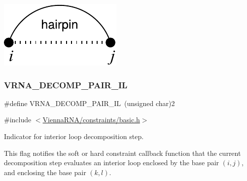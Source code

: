  
\begin{DoxyImageNoCaption}
  \mbox{\includegraphics[width=\textwidth,height=\textheight/2,keepaspectratio=true]{decomp_hp}}
\end{DoxyImageNoCaption}
 \mbox{\label{group__constraints_gaeab04f34d7730cff2d651d782f95d857}} 
\subsubsection{\texorpdfstring{VRNA\_DECOMP\_PAIR\_IL}{VRNA\_DECOMP\_PAIR\_IL}}
{\footnotesize\ttfamily \#define V\+R\+N\+A\+\_\+\+D\+E\+C\+O\+M\+P\+\_\+\+P\+A\+I\+R\+\_\+\+IL~(unsigned char)2}



{\ttfamily \#include $<$\mbox{\hyperlink{constraints_2basic_8h}{Vienna\+R\+N\+A/constraints/basic.\+h}}$>$}



Indicator for interior loop decomposition step. 

This flag notifies the soft or hard constraint callback function that the current decomposition step evaluates an interior loop enclosed by the base pair $(i,j)$, and enclosing the base pair $(k,l)$.

